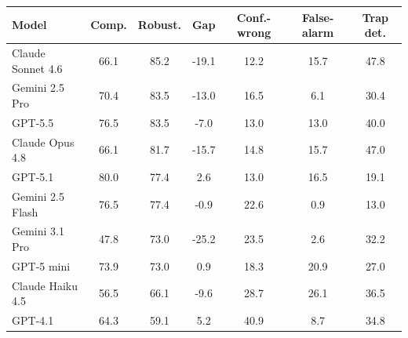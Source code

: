 \begin{tabular}{@{}lcccccc@{}}
\toprule
Model & Comp. & Robust. & Gap & Conf.-wrong & False-alarm & Trap det. \\
\midrule
Claude Sonnet 4.6 & 66.1 & 85.2 & -19.1 & 12.2 & 15.7 & 47.8 \\
Gemini 2.5 Pro & 70.4 & 83.5 & -13.0 & 16.5 & 6.1 & 30.4 \\
GPT-5.5 & 76.5 & 83.5 & -7.0 & 13.0 & 13.0 & 40.0 \\
Claude Opus 4.8 & 66.1 & 81.7 & -15.7 & 14.8 & 15.7 & 47.0 \\
GPT-5.1 & 80.0 & 77.4 & 2.6 & 13.0 & 16.5 & 19.1 \\
Gemini 2.5 Flash & 76.5 & 77.4 & -0.9 & 22.6 & 0.9 & 13.0 \\
Gemini 3.1 Pro & 47.8 & 73.0 & -25.2 & 23.5 & 2.6 & 32.2 \\
GPT-5 mini & 73.9 & 73.0 & 0.9 & 18.3 & 20.9 & 27.0 \\
Claude Haiku 4.5 & 56.5 & 66.1 & -9.6 & 28.7 & 26.1 & 36.5 \\
GPT-4.1 & 64.3 & 59.1 & 5.2 & 40.9 & 8.7 & 34.8 \\
\bottomrule
\end{tabular}
